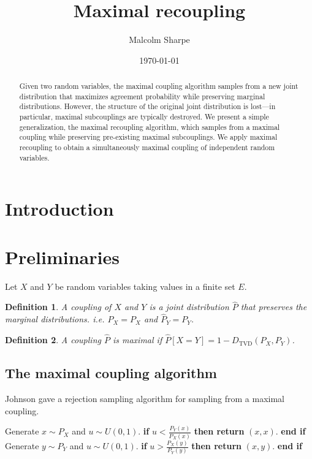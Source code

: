 \documentclass{article}
\title{Maximal recoupling}
\author{Malcolm Sharpe}
\date{\today}
\newtheorem{definition}{Definition}
\begin{document}
\maketitle
\thispagestyle{fancy}

\begin{abstract}
Given two random variables,
the maximal coupling algorithm samples from a new joint distribution that
maximizes agreement probability while preserving marginal distributions.
However, the structure of the original joint distribution is lost---in particular,
maximal subcouplings are typically destroyed.
We present a simple generalization,
the maximal recoupling algorithm,
which samples from a maximal coupling while preserving pre-existing maximal subcouplings.
We apply maximal recoupling to obtain a simultaneously maximal coupling of independent random variables.
\end{abstract}

\section{Introduction}

\section{Preliminaries}

Let $X$ and $Y$ be random variables taking values in a finite set $E$.

\begin{definition}
    A \textit{coupling} of $X$ and $Y$ is a joint distribution $\hat{P}$
    that preserves the marginal distributions.
    i.e. $\hat{P}_X = P_X$ and $\hat{P}_Y = P_Y$.
\end{definition}

\begin{definition}
    A coupling $\hat{P}$ is \textit{maximal} if $\hat{P}[X = Y] = 1 - D_{\text{TVD}}(P_X, P_Y)$.
\end{definition}

\subsection*{The maximal coupling algorithm}

Johnson \cite{johnson1998coupling} gave a rejection sampling algorithm for sampling from a maximal coupling.

\begin{algorithm}[h]
\caption{Maximal coupling \cite{johnson1998coupling}}
\label{alg:maximal_coupling}
\begin{algorithmic}[1]
\STATE Generate \(x \sim P_X\) and \(u \sim U(0,1)\).
\STATE \textbf{if} \(u < \frac{P_Y(x)}{P_X(x)}\) \textbf{then return} \((x, x)\). \textbf{end if}
\LOOP
\STATE Generate \(y \sim P_Y\) and \(u \sim U(0,1)\).
\STATE \textbf{if} \(u > \frac{P_X(y)}{P_Y(y)}\) \textbf{then return} \((x, y)\). \textbf{end if}
\ENDLOOP
\end{algorithmic}
\end{algorithm}
\end{document}
